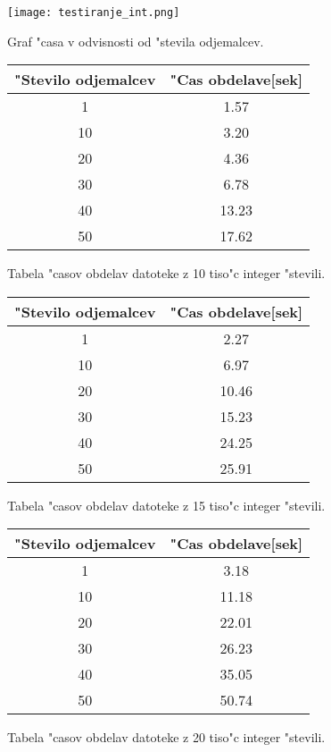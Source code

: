 \begin{figure}
  \centering
    \texttt{[image: testiranje\_int.png]}
  \caption{Graf "casa v odvisnosti od "stevila odjemalcev.}
  \label{8_test1}  
\end{figure}

\begin{figure}
  \centering
  \begin{tabular}{ | c | c | }
    \hline
    "Stevilo odjemalcev & "Cas obdelave[sek]\\ \hline
	1 & 1.57 \\ \hline
    10 & 3.20 \\ \hline
    20 & 4.36 \\ \hline
    30 & 6.78 \\ \hline
    40 & 13.23 \\ \hline
    50 & 17.62 \\ \hline
  \end{tabular}
  \caption{Tabela "casov obdelav datoteke z 10 tiso"c integer "stevili.}
  \label{8_table1}
  \centering
\end{figure}

\begin{figure}
  \centering
  \begin{tabular}{ | c | c | }
    \hline
    "Stevilo odjemalcev & "Cas obdelave[sek]\\ \hline
	1 & 2.27 \\ \hline
    10 & 6.97 \\ \hline
    20 & 10.46 \\ \hline
	30 & 15.23 \\ \hline
    40 & 24.25 \\ \hline
    50 & 25.91 \\ \hline
  \end{tabular}
  \caption{Tabela "casov obdelav datoteke z 15 tiso"c integer "stevili.}
  \label{8_table2}
  \centering
\end{figure}

\begin{figure}
  \centering
  \begin{tabular}{ | c | c | }
    \hline
    "Stevilo odjemalcev & "Cas obdelave[sek]\\ \hline
	1 & 3.18 \\ \hline
    10 & 11.18 \\ \hline
    20 & 22.01 \\ \hline
	30 & 26.23 \\ \hline
    40 & 35.05 \\ \hline
    50 & 50.74 \\ \hline
  \end{tabular}
  \caption{Tabela "casov obdelav datoteke z 20 tiso"c integer "stevili.}
  \label{8_table3}
  \centering
\end{figure}

